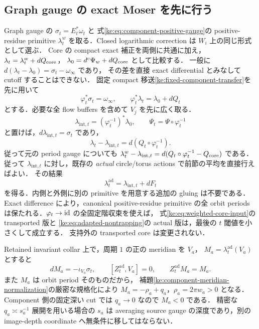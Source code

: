 \subsection{Graph gauge の exact Moser を先に行う}

Graph gauge の $\sigma_t=E_t^*\omega_t$ と
式\eqref{ke:eq:component-positive-gauge}の positive-residue primitive $\lambda_t^w$
を取る．Closed logarithmic correction は $W_i$ 上の同じ形式として選ぶ．
Core の compact exact 補正を両側に共通に加え，
$\lambda_t=\lambda_t^w+dQ_{\rm core}$，
$\lambda_0=d^c\Psi_w+dQ_{\rm core}$ として比較する．
一般に $d(\lambda_t-\lambda_0)=\sigma_t-\omega_\infty$ であり，
その差を直接 exact differential とみなして cutoff することはできない．
固定 compact 移送\ref{ke:fixed-component-transfer}を先に用いて
\[
 \varphi_t^*\sigma_t=\omega_\infty,
 \qquad \varphi_t^*\lambda_t=\lambda_0+dQ_t
\]
とする．必要な全 flow buffers を含めて $V_j$ を先に広く取る．
\[
 \lambda_{\mathrm{int},t}=(\varphi_t^{-1})^*\lambda_0,
 \qquad \Psi_t=\Psi\circ\varphi_t^{-1}
\]
と置けば，$d\lambda_{\mathrm{int},t}=\sigma_t$ であり，
\begin{equation}\label{ke:eq:transported-core-primitive-periods}
 \lambda_t-\lambda_{\mathrm{int},t}
   =d(Q_t\circ\varphi_t^{-1}).
\end{equation}
従って元の period gauge についても
$\lambda_t^w-\lambda_{\mathrm{int},t}
=d(Q_t\circ\varphi_t^{-1}-Q_{\rm core})$ である．
従って $\lambda_{\mathrm{int},t}$ に対し，既存の \emph{actual} circle/torus actions
で前節の平均を直接行えばよい．
その結果
\[
 \lambda^{\mathrm{ad}}_t=\lambda_{\mathrm{int},t}+dF_t
\]
を得る．内側と外側に別の primitive を用意する追加の gluing は不要である．
Exact difference により，canonical positive-residue primitive の全 orbit periods
は保たれる．$\varphi_t\to\operatorname{id}$ の全固定階収束を使えば，
式\eqref{ke:eq:weighted-core-input}の transported 版と
\eqref{ke:eq:adapted-nontrapping}の actual 版は，最後の $t$ 閾値を小さくして成立する．
支持外の transported core は変更されない．

Retained invariant collar 上で，周期 $1$ の正の meridian を $V_a$，
$M_a=\lambda^{\mathrm{ad}}_t(V_a)$ とすると
\[
 dM_a=-\iota_{V_a}\sigma_t,
 \qquad [Z^{\mathrm{ad}}_t,V_a]=0,
 \qquad Z^{\mathrm{ad}}_tM_a=M_a.
\]
また $M_a$ は orbit period そのものだから，
補題\ref{ke:component-meridian-normalization}の厳密な規格化により
$M_a=-\rho_a+q_a$，$\rho_a=2\pi w_a>0$ となる．
Component 側の固定深い cut では $q_a\to0$ なので $M_a<0$ である．
精密な $q_a\asymp s_a^{-1}$ 展開を用いる場合の $s_a$ は averaging source gauge
の深度であり，別の image-depth coordinate へ無条件に移してはならない．

